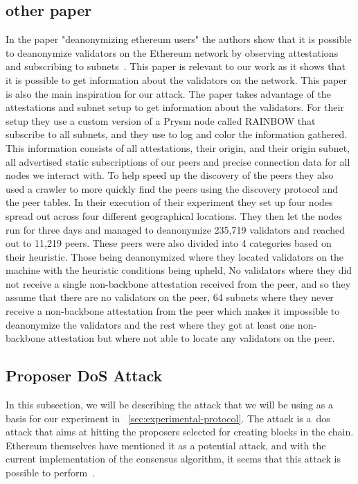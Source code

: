 \subsection{other paper}\label{subsec:other-papers} 
In the paper "deanonymizing ethereum users" the authors show that it is possible to deanonymize validators on the Ethereum network by observing attestations and subscribing to subnets~\cite{heimbach2024deanonymizingethereumvalidatorsp2p}.
This paper is relevant to our work as it shows that it is possible to get information about the validators on the network.
This paper is also the main inspiration for our attack.
The paper takes advantage of the attestations and subnet setup to get information about the validators.
For their setup they use a custom version of a Prysm node called RAINBOW that subscribe to all subnets, and they use to log and color the information gathered.
This information consists of all attestations, their origin, and their origin subnet, all advertised static subscriptions of our peers and precise connection data for all nodes we interact with.
To help speed up the discovery of the peers they also used a crawler to more quickly find the peers using the discovery protocol and the peer tables.
In their execution of their experiment they set up four nodes spread out across four different geographical locations.
They then let the nodes run for three days and managed to deanonymize 235,719 validators and reached out to 11,219 peers.
These peers were also divided into 4 categories based on their heuristic.
Those being deanonymized where they located validators on the machine with the heuristic conditions being upheld, No validators where they did not receive a single non-backbone attestation received from the peer, and so they assume that there are no validators on the peer, 64 subnets where they never receive a non-backbone attestation from the peer which makes it impossible to deanonymize the validators and the rest where they got at least one non-backbone attestation but where not able to locate any validators on the peer.




\subsection{Proposer DoS Attack}\label{subsec:proposer-dos-attack}
In this subsection, we will be describing the attack that we will be using as a basis for our experiment in ~\autoref{sec:experimental-protocol}.
The attack is a~\gls{dos} attack that aims at hitting the proposers selected for creating blocks in the chain.
Ethereum themselves have mentioned it as a potential attack, and with the current implementation of the consensus algorithm, it seems that this attack is possible to perform~\cite{EthereumSSLE2024,EthereumAttackDefense2024}.

